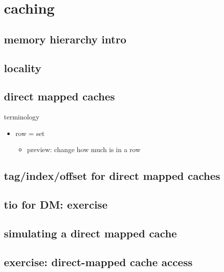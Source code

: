 \section{caching}

\subsection{memory hierarchy intro}


\subsection{locality}


\subsection{direct mapped caches}


\begin{frame}{terminology}
    \begin{itemize}
    \item row = set
        \begin{itemize}
        \item preview: change how much is in a row
        \end{itemize}
    \end{itemize}
\end{frame}

\subsection{tag/index/offset for direct mapped caches}


\subsection{tio for DM: exercise}


\subsection{simulating a direct mapped cache}


\subsection{exercise: direct-mapped cache access}


